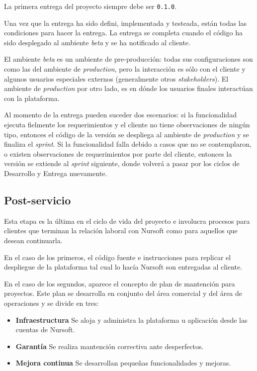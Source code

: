 La primera entrega del proyecto siempre debe ser \texttt{0.1.0}.

Una vez que la entrega ha sido defini, implementada y testeada, están todas las condiciones para hacer la entrega.
La entrega se completa cuando el código ha sido desplegado al ambiente \textit{beta} y se ha notificado al cliente. 

El ambiente \textit{beta} es un ambiente de pre-producción: todas sus configuraciones son como las del ambiente de 
\textit{production}, pero la interacción es sólo con el cliente y algunos usuarios especiales externos (generalmente
otros \textit{stakeholders}). El ambiente de \textit{production} por otro lado, es en dónde los usuarios finales interactúan con la
plataforma.

Al momento de la entrega pueden suceder dos escenarios: si la funcionalidad ejecuta fielmente los requerimientos y el cliente no tiene observaciones
de ningún tipo, entonces el código de la versión se despliega al ambiente de \textit{production} y se finaliza el \textit{sprint}.
Si la funcionalidad falla debido a casos que no se contemplaron, o existen observaciones de requerimientos por parte del cliente,
entonces la versión se extiende al \textit{sprint} siguiente, donde volverá a pasar por los ciclos de Desarrollo y Entrega nuevamente.


\subsection{Post-servicio}
Esta etapa es la última en el ciclo de vida del proyecto e involucra procesos para clientes que terminan la relación
laboral con Nursoft como para aquellos que desean continuarla.

En el caso de los primeros, el código fuente e instrucciones para replicar el despliegue de la plataforma tal cual lo hacía Nursoft
son entregadas al cliente.

En el caso de los segundos, aparece el concepto de plan de mantención para proyectos. 
Este plan se desarrolla en conjunto del área comercial y del área de operaciones y se divide en tres:

\begin{itemize}
  \item \textbf{Infraestructura} Se aloja y administra la plataforma u aplicación desde las cuentas de Nursoft.
  \item \textbf{Garantía} Se realiza mantención correctiva ante desperfectos.
  \item \textbf{Mejora continua} Se desarrollan pequeñas funcionalidades y mejoras.
\end{itemize}

